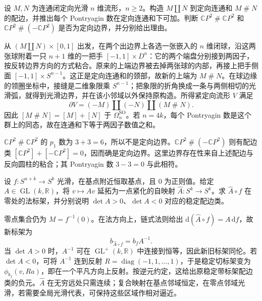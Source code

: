 \begin{exercise}\label{g2:ex:connected-sum-bordism}
	设 \(M,N\) 为连通闭定向光滑 \(n\) 维流形，\(n\ge2\)。构造 \(M\amalg N\) 到定向连通和 \(M\mathbin{\#}N\) 的配边，并推出每个 Pontryagin 数在定向连通和下可加。判断 \(\mathbb CP^2\mathbin{\#}\mathbb CP^2\) 和 \(\mathbb CP^2\mathbin{\#}(-\mathbb CP^2)\) 是否为定向边界，并分别给出理由。
\end{exercise}
\begin{solution}
	从 \((M\amalg N)\times[0,1]\) 出发，在两个出边界上各选一张嵌入的 \(n\) 维闭球，沿这两张球附着一只 \(n+1\) 维的一把手 \([-1,1]\times D^n\)：它的两个端盘分别接到两因子，按反转边界方向的方式粘合。原来的上端边界被去掉两张球的内部，再接上把手侧面 \([-1,1]\times S^{n-1}\)。这正是定向连通和的颈部，故新的上端为 \(M\mathbin{\#}N\)。在球边缘的领圈坐标中，接缝是二维象限乘 \(S^{n-1}\)；把象限的折角换成一条与两侧相切的光滑弧，就得到光滑边界，并在该小邻域以外保持原构造。所得紧定向流形 \(V\) 满足
	\[
		\partial V=(-M)\amalg(-N)\amalg(M\mathbin{\#}N).
	\]
	因此 \([M\mathbin{\#}N]=[M]+[N]\) 于 \(\Omega_n^{\mathrm{SO}}\)。若 \(n=4k\)，每个 Pontryagin 数是这个群上的同态，故在连通和下等于两因子数值之和。

	\(\mathbb CP^2\mathbin{\#}\mathbb CP^2\) 的 \(p_1\) 数为 \(3+3=6\)，所以不是定向边界。\(\mathbb CP^2\mathbin{\#}(-\mathbb CP^2)\) 则有配边类 \([\mathbb CP^2]+[-\mathbb CP^2]=0\)，因而确是定向边界。这里边界存在性来自上述配边与反向圆柱的粘合；其 Pontryagin 数 \(3-3=0\) 与此相符。
\end{solution}

\begin{exercise}\label{g2:ex:pt-change-target-frame}
	设 \(f:S^{n+k}\to S^k\) 光滑，在基点附近恒取基点，且 \(0\) 为正则值。给定 \(A\in\operatorname{GL}(k,\mathbb R)\)，将 \(v\mapsto Av\) 延拓为一点紧化的自映射 \(\widehat A:S^k\to S^k\)。求 \(\widehat A\circ f\) 在零处的法标架，并分别说明 \(\det A>0\)、\(\det A<0\) 对应的稳定配边类。
\end{exercise}
\begin{solution}
	零点集合仍为 \(M=f^{-1}(0)\)。在法方向上，链式法则给出 \(\mathrm d(\widehat A\circ f)=A\,\mathrm df\)，故新标架为
	\[
		b_{\widehat A\circ f}=b_fA^{-1}.
	\]
	当 \(\det A>0\) 时，\(A^{-1}\) 可在 \(\operatorname{GL}^+(k,\mathbb R)\) 中连接到恒等，因此新旧标架同伦。若 \(\det A<0\)，可将 \(A^{-1}\) 连到反射 \(R=\operatorname{diag}(-1,1,\ldots,1)\)，于是稳定切标架变为 \(\phi_{b_f}(v,Ra)\)，即在一个平凡方向上反射。按逆元约定，这给出原稳定带标架配边类的负元。\(\widehat A\) 在无穷远处只需连续；复合映射在基点邻域恒定，在零点邻域光滑，若需要全局光滑代表，可保持这些区域作相对逼近。
\end{solution}

